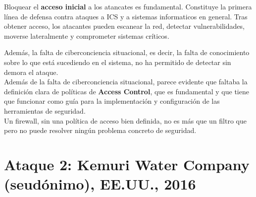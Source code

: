 Bloquear el \textbf{acceso inicial} a los atancates es fundamental. Constituye la primera línea de defensa contra ataques a ICS y a sistemas informaticos en general. Tras obtener acceso, los atacantes pueden escanear la red, detectar vulnerabilidades, moverse lateralmente y comprometer sistemas críticos.

Además, la falta de ciberconciencia situacional, es decir, la falta de conocimiento sobre lo que está sucediendo en el sistema, no ha permitido de detectar sin demora el ataque.\\
Además de la falta de ciberconciencia situacional, parece evidente que faltaba la definición clara de políticas de \textbf{Access Control}, que es fundamental y que tiene que funcionar como guía para la implementación y configuración de las herramientas de seguridad.\\
Un firewall, sin una política de acceso bien definida, no es más que un filtro que pero no puede resolver ningún problema concreto de seguridad.
\newpage


\section{Ataque 2: Kemuri Water Company (seudónimo), EE.UU., 2016}

